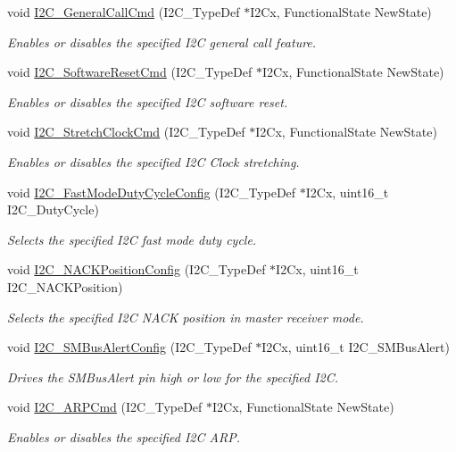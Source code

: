 \begin{DoxyCompactItemize}
void \hyperlink{group___i2_c___group1_ga65c740fc8d7b3b9f15cc432d8699d471}{I2\-C\-\_\-\-General\-Call\-Cmd} (I2\-C\-\_\-\-Type\-Def $\ast$I2\-Cx, Functional\-State New\-State)
\begin{DoxyCompactList}\small\item\em Enables or disables the specified I2\-C general call feature. \end{DoxyCompactList}\item 
void \hyperlink{group___i2_c___group1_ga1289c908aeb882443aba323b459c638b}{I2\-C\-\_\-\-Software\-Reset\-Cmd} (I2\-C\-\_\-\-Type\-Def $\ast$I2\-Cx, Functional\-State New\-State)
\begin{DoxyCompactList}\small\item\em Enables or disables the specified I2\-C software reset. \end{DoxyCompactList}\item 
void \hyperlink{group___i2_c___group1_ga7459feb3b1dfcd3e4f6574002ca7d3bd}{I2\-C\-\_\-\-Stretch\-Clock\-Cmd} (I2\-C\-\_\-\-Type\-Def $\ast$I2\-Cx, Functional\-State New\-State)
\begin{DoxyCompactList}\small\item\em Enables or disables the specified I2\-C Clock stretching. \end{DoxyCompactList}\item 
void \hyperlink{group___i2_c___group1_gaa570f76bc34e5b0531b29b1a90af1275}{I2\-C\-\_\-\-Fast\-Mode\-Duty\-Cycle\-Config} (I2\-C\-\_\-\-Type\-Def $\ast$I2\-Cx, uint16\-\_\-t I2\-C\-\_\-\-Duty\-Cycle)
\begin{DoxyCompactList}\small\item\em Selects the specified I2\-C fast mode duty cycle. \end{DoxyCompactList}\item 
void \hyperlink{group___i2_c___group1_gad08ebffc3a234d84e6405ec115bd74f1}{I2\-C\-\_\-\-N\-A\-C\-K\-Position\-Config} (I2\-C\-\_\-\-Type\-Def $\ast$I2\-Cx, uint16\-\_\-t I2\-C\-\_\-\-N\-A\-C\-K\-Position)
\begin{DoxyCompactList}\small\item\em Selects the specified I2\-C N\-A\-C\-K position in master receiver mode. \end{DoxyCompactList}\item 
void \hyperlink{group___i2_c___group1_ga75a810776d9710d2f6d9c5d9e93241c6}{I2\-C\-\_\-\-S\-M\-Bus\-Alert\-Config} (I2\-C\-\_\-\-Type\-Def $\ast$I2\-Cx, uint16\-\_\-t I2\-C\-\_\-\-S\-M\-Bus\-Alert)
\begin{DoxyCompactList}\small\item\em Drives the S\-M\-Bus\-Alert pin high or low for the specified I2\-C. \end{DoxyCompactList}\item 
void \hyperlink{group___i2_c___group1_ga66d86742bf1be58b17ef8779ffc79d02}{I2\-C\-\_\-\-A\-R\-P\-Cmd} (I2\-C\-\_\-\-Type\-Def $\ast$I2\-Cx, Functional\-State New\-State)
\begin{DoxyCompactList}\small\item\em Enables or disables the specified I2\-C A\-R\-P. \end{DoxyCompactList}\end{DoxyCompactItemize}


